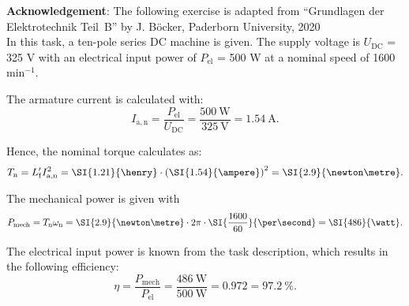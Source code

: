 

\normalsize{\textbf{Acknowledgement}: The following exercise is adapted from ``Grundlagen der Elektrotechnik Teil~B'' by J. Böcker, Paderborn University, 2020}\\




In this task, a ten-pole series DC machine is given. The supply voltage is $U_{\mathrm{DC}}$ = 325 V with an electrical input power of $P_{\mathrm{el}}$ = 500 W at a nominal speed of 1600 $\mathrm{min^{-1}}$.



\begin{solutionblock}
  The armature current is calculated with:
  \begin{equation}
    I_{\mathrm{a,n}} = \frac{P_{\mathrm{el}}}{U_{\mathrm{DC}}}
    = \frac{\SI{500}{\watt}}{\SI{325}{\volt}}
    = \SI{1.54}{\ampere}.
  \end{equation}

  Hence, the nominal torque calculates as:
  \begin{equation}
    \Tn = L_{\mathrm{f}}' I_{\mathrm{a,n}}^2
    = \SI{1.21}{\henry} \cdot \left(\SI{1.54}{\ampere} \right)^2
    = \SI{2.9}{\newton \metre}.
  \end{equation}
\end{solutionblock}



\begin{solutionblock}
  The mechanical power is given with
  \begin{equation}
    P_{\mathrm{mech}} = \Tn \omega_{\mathrm{n}}
    = \SI{2.9}{\newton \metre} \cdot 2 \pi \cdot \SI{\frac{1600}{60}}
    { \per \second}
    = \SI{486}{\watt}.
  \end{equation}

  The electrical input power is known from the task description, which results in the following efficiency:
  \begin{equation}
    \eta = \frac{P_{\mathrm{mech}}}{P_{\mathrm{el}}}
    = \frac{\SI{486}{\watt}}{\SI{500}{\watt}}
    = 0.972 = \SI{97.2}{\%}.
  \end{equation}
\end{solutionblock}


